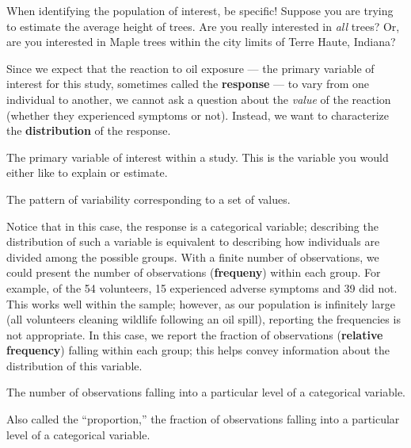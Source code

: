 \documentclass[]{book}
\theoremstyle{plain}
\theoremstyle{mydefn}
\theoremstyle{myexmpl}
\theoremstyle{remark}
\let\BeginKnitrBlock\begin \let\EndKnitrBlock\end
\let\BeginKnitrBlock\begin \let\EndKnitrBlock\end
\begin{document}
\BeginKnitrBlock{rmdtip}
When identifying the population of interest, be specific! Suppose you
are trying to estimate the average height of trees. Are you really
interested in \emph{all} trees? Or, are you interested in Maple trees
within the city limits of Terre Haute, Indiana?
\EndKnitrBlock{rmdtip}

Since we expect that the reaction to oil exposure --- the primary
variable of interest for this study, sometimes called the
\textbf{response} --- to vary from one individual to another, we cannot
ask a question about the \emph{value} of the reaction (whether they
experienced symptoms or not). Instead, we want to characterize the
\textbf{distribution} of the response.

\BeginKnitrBlock{definition}[Response]
\protect\hypertarget{def:defn-response}{}{\label{def:defn-response}
{} }The primary variable of interest within a
study. This is the variable you would either like to explain or
estimate.
\EndKnitrBlock{definition}

\BeginKnitrBlock{definition}[Distribution]
\protect\hypertarget{def:defn-distribution}{}{\label{def:defn-distribution}
{} }The pattern of variability corresponding
to a set of values.
\EndKnitrBlock{definition}

Notice that in this case, the response is a categorical variable;
describing the distribution of such a variable is equivalent to
describing how individuals are divided among the possible groups. With a
finite number of observations, we could present the number of
observations (\textbf{frequeny}) within each group. For example, of the
54 volunteers, 15 experienced adverse symptoms and 39 did not. This
works well within the sample; however, as our population is infinitely
large (all volunteers cleaning wildlife following an oil spill),
reporting the frequencies is not appropriate. In this case, we report
the fraction of observations (\textbf{relative frequency}) falling
within each group; this helps convey information about the distribution
of this variable.

\BeginKnitrBlock{definition}[Frequency]
\protect\hypertarget{def:defn-frequency}{}{\label{def:defn-frequency}
{} }The number of observations falling into a
particular level of a categorical variable.
\EndKnitrBlock{definition}

\BeginKnitrBlock{definition}[Relative Frequency]
\protect\hypertarget{def:defn-relative-frequency}{}{\label{def:defn-relative-frequency}
{} }Also called the ``proportion,'' the
fraction of observations falling into a particular level of a
categorical variable.
\EndKnitrBlock{definition}
\end{document}
